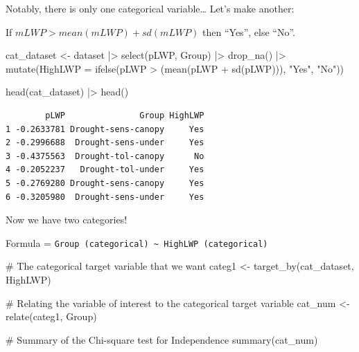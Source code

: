 \documentclass[
  letterpaper,
  DIV=11,
  numbers=noendperiod]{scrreprt}
\newenvironment{Shaded}{\begin{snugshade}}{\end{snugshade}}
\newcommand{\AttributeTok}[1]{\textcolor[rgb]{0.40,0.45,0.13}{#1}}
\newcommand{\CommentTok}[1]{\textcolor[rgb]{0.37,0.37,0.37}{#1}}
\newcommand{\FunctionTok}[1]{\textcolor[rgb]{0.28,0.35,0.67}{#1}}
\newcommand{\NormalTok}[1]{\textcolor[rgb]{0.00,0.23,0.31}{#1}}
\newcommand{\OtherTok}[1]{\textcolor[rgb]{0.00,0.23,0.31}{#1}}
\newcommand{\SpecialCharTok}[1]{\textcolor[rgb]{0.37,0.37,0.37}{#1}}
\newcommand{\StringTok}[1]{\textcolor[rgb]{0.13,0.47,0.30}{#1}}
\begin{document}
Notably, there is only one categorical variable\ldots{} Let's make
another:

If \(mLWP > mean(mLWP) + sd(mLWP)\) then ``Yes'', else ``No''.

\begin{Shaded}
\begin{Highlighting}[]
\NormalTok{cat\_dataset }\OtherTok{\textless{}{-}}\NormalTok{ dataset }\SpecialCharTok{|\textgreater{}}
  \FunctionTok{select}\NormalTok{(pLWP, Group) }\SpecialCharTok{|\textgreater{}}
  \FunctionTok{drop\_na}\NormalTok{() }\SpecialCharTok{|\textgreater{}}
  \FunctionTok{mutate}\NormalTok{(}\AttributeTok{HighLWP =} \FunctionTok{ifelse}\NormalTok{(pLWP }\SpecialCharTok{\textgreater{}}\NormalTok{ (}\FunctionTok{mean}\NormalTok{(pLWP }\SpecialCharTok{+} \FunctionTok{sd}\NormalTok{(pLWP))), }\StringTok{"Yes"}\NormalTok{, }\StringTok{"No"}\NormalTok{))}

\FunctionTok{head}\NormalTok{(cat\_dataset) }\SpecialCharTok{|\textgreater{}}
  \FunctionTok{head}\NormalTok{()}
\end{Highlighting}
\end{Shaded}

\begin{verbatim}
        pLWP               Group HighLWP
1 -0.2633781 Drought-sens-canopy     Yes
2 -0.2996688  Drought-sens-under     Yes
3 -0.4375563  Drought-tol-canopy      No
4 -0.2052237   Drought-tol-under     Yes
5 -0.2769280 Drought-sens-canopy     Yes
6 -0.3205980  Drought-sens-under     Yes
\end{verbatim}

Now we have two categories!

Formula =
\texttt{Group\ (categorical)\ \textasciitilde{}\ HighLWP\ (categorical)}

\begin{Shaded}
\begin{Highlighting}[]
\CommentTok{\# The categorical target variable that we want}
\NormalTok{categ1 }\OtherTok{\textless{}{-}} \FunctionTok{target\_by}\NormalTok{(cat\_dataset, HighLWP)}

\CommentTok{\# Relating the variable of interest to the categorical target variable}
\NormalTok{cat\_num }\OtherTok{\textless{}{-}} \FunctionTok{relate}\NormalTok{(categ1, Group)}

\CommentTok{\# Summary of the Chi{-}square test for Independence}
\FunctionTok{summary}\NormalTok{(cat\_num)}
\end{Highlighting}
\end{Shaded}
\end{document}
